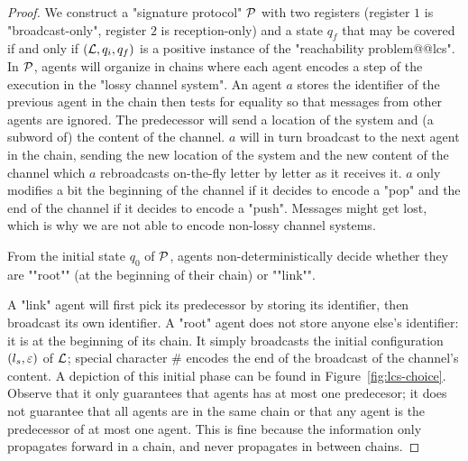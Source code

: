\begin{proof}
	We construct a "signature protocol" $\mathcal{P}$ with two registers (register $1$ is "broadcast-only", register $2$ is reception-only) and a state $q_f$ that may be covered if and only if $(\mathcal{L}, q_i, q_f)$ is a positive instance of the "reachability problem@@lcs". In $\mathcal{P}$, agents will organize in chains where each agent encodes a step of the execution in the "lossy channel system". An agent $a$ stores the identifier of the previous agent in the chain then tests for equality so that messages from other agents are ignored. The predecessor will send a location of the system and (a subword of) the content of the channel. $a$ will in turn broadcast to the next agent in the chain, sending the new location of the system and the new content of the channel which $a$ rebroadcasts on-the-fly letter by letter as it receives it. $a$ only modifies a bit the beginning of the channel if it decides to encode a "pop" and the end of the channel if it decides to encode a "push". Messages might get lost, which is why we are not able to encode non-lossy channel systems.
	
	\AP From the initial state $q_0$ of $\mathcal{P}$, agents non-deterministically decide whether they are ""root"" (at the beginning of their chain) or ""link"". 
	
	A "link" agent will first pick its predecessor by storing its identifier, then broadcast its own identifier.
	A "root" agent does not store anyone else's identifier: it is at the beginning of its chain. It simply broadcasts the initial configuration $(l_s,\varepsilon)$ of $\mathcal{L}$; special character $\#$ encodes the end of the broadcast of the channel's content.  A depiction of this initial phase can be found in Figure~\ref{fig:lcs-choice}.  
	Observe that it only guarantees that agents has at most one predecesor; it does not guarantee that all agents are in the same chain or that any agent is the predecessor of at most one agent. This is fine because the information only propagates forward in a chain, and never propagates in between chains. 


\end{proof}
